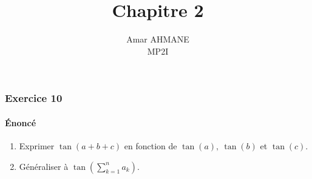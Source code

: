 \documentclass[14pt]{article}
\title{\huge\textbf{Chapitre 2}}
\author{Amar AHMANE\\ MP2I}
\date{}
\begin{document}
    \maketitle
    \subsubsection*{Exercice 10}
    \paragraph{Énoncé} 
    \begin{enumerate}
        \item Exprimer $\tan(a+b+c)$ en fonction de $\tan(a),\ \tan(b)$ et $\tan(c)$.
        \item Généraliser à $\tan\left(\sum_{k=1}^na_k\right)$.
    \end{enumerate}
    
\end{document}

